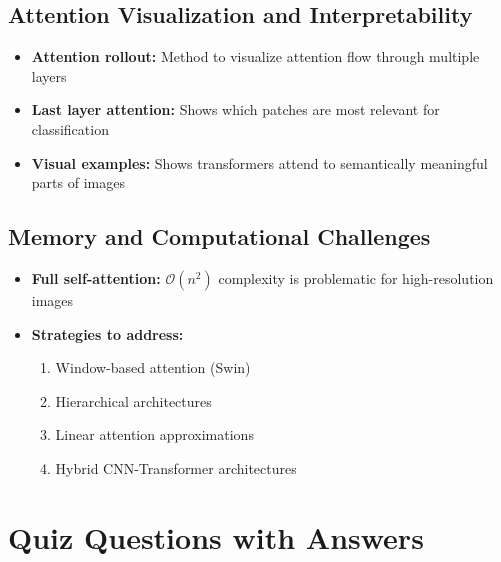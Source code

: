 \subsection*{Attention Visualization and Interpretability}
\begin{itemize}
    \item \textbf{Attention rollout:} Method to visualize attention flow through multiple layers
    \item \textbf{Last layer attention:} Shows which patches are most relevant for classification
    \item \textbf{Visual examples:} Shows transformers attend to semantically meaningful parts of images
\end{itemize}

\subsection*{Memory and Computational Challenges}
\begin{itemize}
    \item \textbf{Full self-attention:} $\mathcal{O}(n^2)$ complexity is problematic for high-resolution images
    \item \textbf{Strategies to address:}
    \begin{enumerate}
        \item Window-based attention (Swin)
        \item Hierarchical architectures
        \item Linear attention approximations
        \item Hybrid CNN-Transformer architectures
    \end{enumerate}
\end{itemize}
\section{Quiz Questions with Answers}

